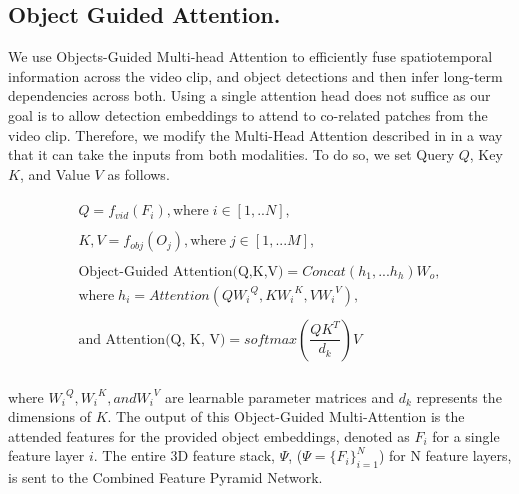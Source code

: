 \documentclass[10pt,twocolumn,letterpaper]{article}
\begin{document}
\subsection{Object Guided Attention.}
We use Objects-Guided Multi-head Attention to efficiently fuse spatiotemporal information across the video clip, and object detections and then infer long-term dependencies across both. Using a single attention head does not suffice as our goal is to allow detection embeddings to attend to co-related patches from the video clip. Therefore, we modify the Multi-Head Attention described in \cite{vaswani_attn} in a way that it can take the inputs from both modalities. To do so, we set Query $Q$, Key $K$, and Value $V$ as follows.

\begin{align}
    \begin{array}{c}
     Q = f_{vid}(F_i), \text{where}\;i \in [1,..N], \\
     \\
    K, V = f_{obj}(O_j), \text{where}\;j \in [1,...M],\\
    \\
    \text{Object-Guided Attention(Q,K,V)} = Concat(h_1, ... h_h)W_o, \\
    \text{where}\; h_i = Attention({QW_i}^Q, {KW_i}^K, {VW_i}^V), \\
    \\
    \text{and Attention(Q, K, V)} = softmax(\dfrac{{{QK}^T}}{d_k})V  
    \\
    \end{array}  
\end{align}

where ${W_i}^Q, {W_i}^K, and {W_i}^V$ are learnable parameter matrices and $d_k$ represents the dimensions of $K$. The output of this Object-Guided Multi-Attention is the attended features for the provided object embeddings, denoted as $F_i$ for a single feature layer $i$. The entire 3D feature stack, $\Psi$, ($\Psi = \{{F_i\}^N_{i=1}}$) for N feature layers, is sent to the Combined Feature Pyramid Network. \\
\end{document}
